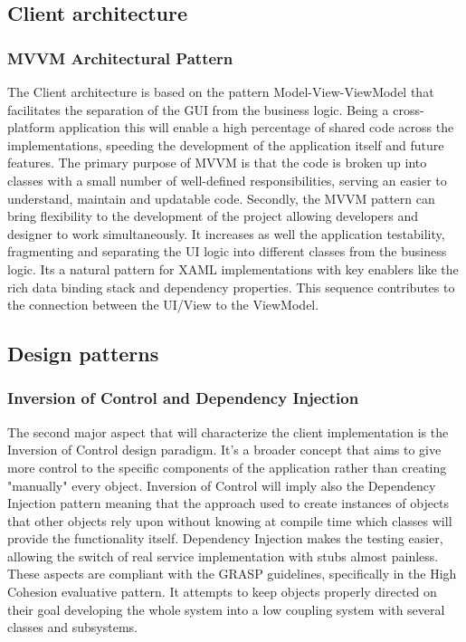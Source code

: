\subsection*{Client architecture}
\subsubsection*{MVVM Architectural Pattern}
The Client architecture is based on the pattern Model-View-ViewModel that facilitates the separation of the GUI from the business logic. Being a cross-platform application this will enable a high percentage of shared code across the implementations, speeding the development of the application itself and future features. The primary purpose of MVVM is that the code is broken up into classes with a small number of well-defined responsibilities, serving an easier to understand, maintain and updatable code. Secondly, the MVVM pattern can bring flexibility to the development of the project allowing developers and designer to work simultaneously. It increases as well the application testability, fragmenting and separating the UI logic into different classes from the business logic.
Its a natural pattern for XAML implementations with key enablers like the rich data binding stack and dependency properties. 
This sequence contributes to the connection between the UI/View to the ViewModel.

\subsection*{Design patterns}
\subsubsection*{Inversion of Control and Dependency Injection}

The second major aspect that will characterize the client implementation is the Inversion of Control design paradigm. 
It's a broader concept that aims to give more control to the specific components of the application rather than creating "manually" every object.
Inversion of Control will imply also the Dependency Injection pattern meaning that the approach used to create instances of objects that other objects rely upon without knowing at compile time which classes will provide the functionality itself.
Dependency Injection makes the testing easier, allowing the switch of real service implementation with stubs almost painless.
These aspects are compliant with the GRASP guidelines, specifically in the High Cohesion evaluative pattern.
It attempts to keep objects properly directed on their goal developing the whole system into a low coupling system with several classes and subsystems.

